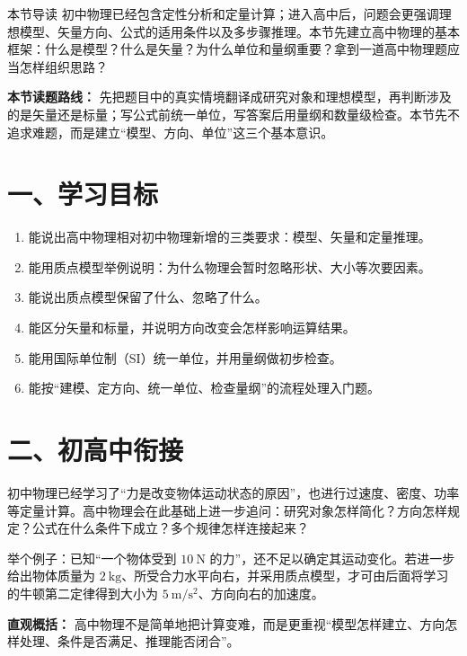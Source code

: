 
\begin{learningbox}{本节导读}
初中物理已经包含定性分析和定量计算；进入高中后，问题会更强调理想模型、矢量方向、公式的适用条件以及多步骤推理。本节先建立高中物理的基本框架：什么是模型？什么是矢量？为什么单位和量纲重要？拿到一道高中物理题应当怎样组织思路？
\end{learningbox}

\textbf{本节读题路线：} 先把题目中的真实情境翻译成研究对象和理想模型，再判断涉及的是矢量还是标量；写公式前统一单位，写答案后用量纲和数量级检查。本节先不追求难题，而是建立“模型、方向、单位”这三个基本意识。

\section*{一、学习目标}

\begin{enumerate}
  \item 能说出高中物理相对初中物理新增的三类要求：模型、矢量和定量推理。
  \item 能用质点模型举例说明：为什么物理会暂时忽略形状、大小等次要因素。
  \item 能说出质点模型保留了什么、忽略了什么。
  \item 能区分矢量和标量，并说明方向改变会怎样影响运算结果。
  \item 能用国际单位制（SI）统一单位，并用量纲做初步检查。
  \item 能按“建模、定方向、统一单位、检查量纲”的流程处理入门题。
\end{enumerate}

\section*{二、初高中衔接}

初中物理已经学习了“力是改变物体运动状态的原因”，也进行过速度、密度、功率等定量计算。高中物理会在此基础上进一步追问：研究对象怎样简化？方向怎样规定？公式在什么条件下成立？多个规律怎样连接起来？

举个例子：已知“一个物体受到 $10\ \mathrm N$ 的力”，还不足以确定其运动变化。若进一步给出物体质量为 $2\ \mathrm{kg}$、所受合力水平向右，并采用质点模型，才可由后面将学习的牛顿第二定律得到大小为 $5\ \mathrm{m/s^2}$、方向向右的加速度。

\textbf{直观概括：} 高中物理不是简单地把计算变难，而是更重视“模型怎样建立、方向怎样处理、条件是否满足、推理能否闭合”。

